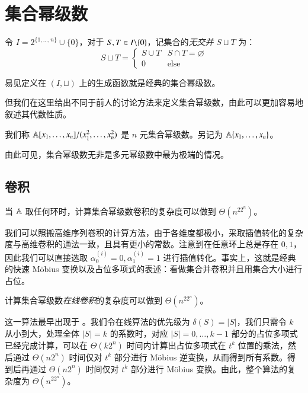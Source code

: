 \section{集合幂级数}

\begin{definition}[集合幂级数的集合定义]
令 $I=2^{\{1,\dots,n\}}\cup\{0\}$，对于 $S,T\in {I \backslash \{0\}}$，记集合的\emph{无交并} $S\sqcup T$ 为：
$$
S\sqcup T = \begin{cases}
S \cup T & S\cap T = \varnothing\\
0 & \mathrm{else}
\end{cases}
$$

易见定义在 $(I,\sqcup)$ 上的生成函数就是经典的集合幂级数。
\end{definition}

但我们在这里给出不同于前人的讨论方法来定义集合幂级数，由此可以更加容易地叙述其代数性质。

\begin{definition}[集合幂级数的多元幂级数定义]
我们称 $\mathbb A[x_1,\dots,x_n]/(x_1^{2},\dots,x_n^{2})$ 是 $n$ 元集合幂级数。另记为 $\mathbb A\{x_1,\dots,x_n\}$。
\end{definition}

由此可见，集合幂级数无非是多元幂级数中最为极端的情况。

\subsection{卷积}

\begin{theorem}\label{cupconv}
当 $\mathbb A$ 取任何环时，计算集合幂级数卷积的复杂度可以做到 $\Theta(n^22^n)$。
\end{theorem}

我们可以照搬高维序列卷积的计算方法，由于各维度都极小，采取插值转化的复杂度与高维卷积的通法一致，且具有更小的常数。注意到在任意环上总是存在 $0,1$，因此我们可以直接选取 $\alpha^{(i)}_0= 0, \alpha^{(i)}_1= 1$ 进行插值转化。事实上，这就是经典的快速 M\"obius 变换以及占位多项式的表述：看做集合并卷积并且用集合大小进行占位。

\begin{theorem}
计算集合幂级数\emph{在线卷积}的复杂度可以做到 $\Theta(n^22^n)$。
\end{theorem}

这一算法最早出现于 \cite{walk}。我们令在线算法的优先级为 $\delta(S) = |S|$，我们只需令 $k$ 从小到大，处理全体 $|S|=k$ 的系数时，对应 $|S|=0,\dots,k-1$ 部分的占位多项式已经完成计算，可以在 $\Theta(k 2^n)$ 时间内计算出占位多项式在 $t^k$ 位置的乘法，然后通过 $\Theta(n2^n)$ 时间仅对 $t^k$ 部分进行 M\"obius 逆变换，从而得到所有系数。得到后再通过 $\Theta(n2^n)$ 时间仅对 $t^k$ 部分进行 M\"obius 变换。由此，整个算法的复杂度为 $\Theta(n^22^n)$。

